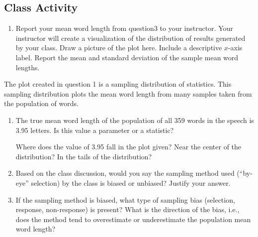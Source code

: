\documentclass[
]{report}
\providecommand{\tightlist}{%
  \setlength{\itemsep}{0pt}\setlength{\parskip}{0pt}}
\begin{document}
\vspace{5in}

\subsection{Class Activity}\label{class-activity}

\begin{enumerate}
\def\labelenumi{\arabic{enumi}.}
\tightlist
\item
  Report your mean word length from question3 to your instructor. Your instructor will create a visualization of the distribution of results generated by your class. Draw a picture of the plot here. Include a descriptive \(x\)-axis label. Report the mean and standard deviation of the sample mean word lengths.
\end{enumerate}

\vspace{2in}

\newpage

The plot created in question 1 is a sampling distribution of statistics. This sampling distribution plots the mean word length from many samples taken from the population of words.

\begin{enumerate}
\def\labelenumi{\arabic{enumi}.}
\setcounter{enumi}{1}
\item
  The true mean word length of the population of all 359 words in the speech is 3.95 letters. Is this value a parameter or a statistic?\\
  \vspace{0.2in}

  Where does the value of 3.95 fall in the plot given? Near the center of the distribution? In the tails of the distribution?
  \vspace{0.3in}
\item
  Based on the class discussion, would you say the sampling method used (``by-eye'' selection) by the class is biased or unbiased? Justify your answer.\\
  \vspace{0.5in}
\item
  If the sampling method is biased, what type of sampling bias (selection, response, non-response) is present? What is the direction of the bias, i.e., does the method tend to overestimate or underestimate the population mean word length?
  \vspace{0.5in}
\end{enumerate}
\end{document}
